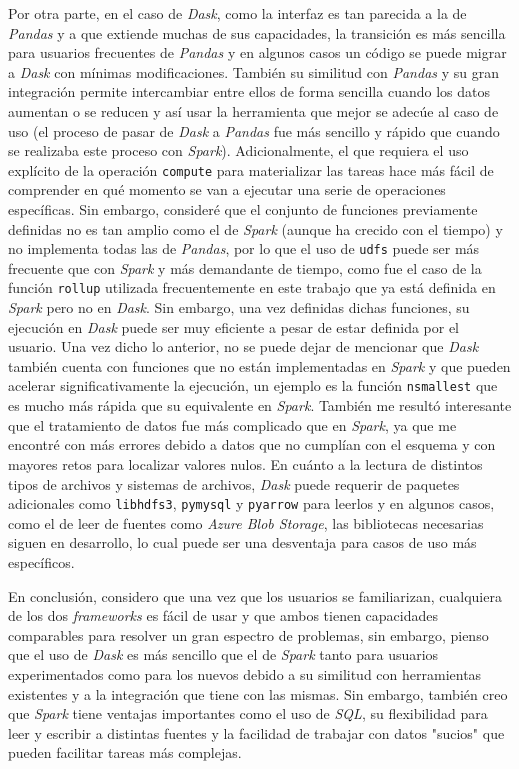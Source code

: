 Por otra parte, en el caso de \textit{Dask}, como la interfaz es tan parecida a la de \textit{Pandas} y a que extiende muchas de sus capacidades, la transición es más sencilla para usuarios frecuentes de \textit{Pandas} y en algunos casos un código se puede migrar a \textit{Dask} con mínimas modificaciones. También su similitud con \textit{Pandas} y su gran integración permite intercambiar entre ellos de forma sencilla cuando los datos aumentan o se reducen y así usar la herramienta que mejor se adecúe al caso de uso (el proceso de pasar de \textit{Dask} a \textit{Pandas} fue más sencillo y rápido que cuando se realizaba este proceso con \textit{Spark}). Adicionalmente, el que requiera el uso explícito de la operación \texttt{compute} para materializar las tareas hace más fácil de comprender en qué momento se van a ejecutar una serie de operaciones específicas. Sin embargo, consideré que el conjunto de funciones previamente definidas no es tan amplio como el de \textit{Spark} (aunque ha crecido con el tiempo) y no implementa todas las de \textit{Pandas}, por lo que el uso de \texttt{udfs} puede ser más frecuente que con \textit{Spark} y más demandante de tiempo, como fue el caso de la función \texttt{rollup} utilizada frecuentemente en este trabajo que ya está definida en \textit{Spark} pero no en \textit{Dask}. Sin embargo, una vez definidas dichas funciones, su ejecución en \textit{Dask} puede ser muy eficiente a pesar de estar definida por el usuario. Una vez dicho lo anterior, no se puede dejar de mencionar que \textit{Dask} también cuenta con funciones que no están implementadas en \textit{Spark} y que pueden acelerar significativamente la ejecución, un ejemplo es la función \texttt{nsmallest} que es mucho más rápida que su equivalente en \textit{Spark}. También me resultó interesante que el tratamiento de datos fue más complicado que en \textit{Spark}, ya que me encontré con más errores debido a datos que no cumplían con el esquema y con mayores retos para localizar valores nulos. En cuánto a la lectura de distintos tipos de archivos y sistemas de archivos, \textit{Dask} puede requerir de paquetes adicionales como \texttt{libhdfs3}, \texttt{pymysql} y \texttt{pyarrow} para leerlos y en algunos casos, como el de leer de fuentes como \textit{Azure Blob Storage}, las bibliotecas necesarias siguen en desarrollo, lo cual puede ser una desventaja para casos de uso más específicos.

En conclusión, considero que una vez que los usuarios se familiarizan, cualquiera de los dos \textit{frameworks} es fácil de usar y que ambos tienen capacidades comparables para resolver un gran espectro de problemas, sin embargo, pienso que el uso de \textit{Dask} es más sencillo que el de \textit{Spark} tanto para usuarios experimentados como para los nuevos debido a su similitud con herramientas existentes y a la integración que tiene con las mismas. Sin embargo, también creo que \textit{Spark} tiene ventajas importantes como el uso de \textit{SQL}, su flexibilidad para leer y escribir a distintas fuentes y la facilidad de trabajar con datos "sucios" que pueden facilitar tareas más complejas.

